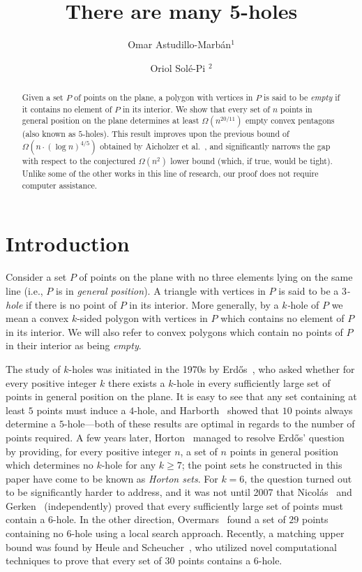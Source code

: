 \documentclass[12pt,reqno, a4paper]{amsart}
\title{There are many 5-holes}
\author{Omar Astudillo-Marbán$^1$ \and Oriol Solé-Pi $^2$}
\date{}
\begin{document}
\begin{abstract}
Given a set $P$ of points on the plane, a polygon with vertices in $P$ is said to be \emph{empty} if it contains no element of $P$ in its interior. We show that every set of $n$ points in general position on the plane determines at least $\Omega(n^{20/11})$ empty convex pentagons (also known as $5$-holes). This result improves upon the previous bound of $\Omega(n\cdot(\log n)^{4/5})$ obtained by Aicholzer et al.~\cite{aichholzer2020superlinear}, and significantly narrows the gap with respect to the conjectured $\Omega(n^2)$ lower bound (which, if true, would be tight). Unlike some of the other works in this line of research, our proof does not require computer assistance.
\end{abstract}
\small\maketitle


\section{Introduction}
Consider a set $P$ of points on the plane with no three elements lying on the same line (i.e., $P$ is in \textit{general position}). A triangle with vertices in $P$ is said to be a $3$\textit{-hole} if there is no point of $P$ in its interior. More generally, by a $k$\textit-hole of $P$ we mean a convex $k$-sided polygon with vertices in $P$ which contains no element of $P$ in its interior. We will also refer to convex polygons which contain no points of $P$ in their interior as being \textit{empty}.

The study of $k$-holes was initiated in the 1970s by Erd\H{o}s~\cite{erdos1978some}, who asked whether for every positive integer $k$ there exists a $k$-hole in every sufficiently large set of points in general position on the plane. It is easy to see that any set containing at least $5$ points must induce a $4$-hole, and Harborth~\cite{harborth1978konvexe} showed that $10$ points always determine a $5$-hole---both of these results are optimal in regards to the number of points required. A few years later, Horton~\cite{horton1983sets} managed to resolve Erd\H{o}s' question by providing, for every positive integer $n$, a set of $n$ points in general position which determines no $k$-hole for any $k\geq 7$; the point sets he constructed in this paper have come to be known as \textit{Horton sets}. For $k=6$, the question turned out to be significantly harder to address, and it was not until 2007 that Nicolás~\cite{nicolas2007empty} and Gerken~\cite{gerken2008empty} (independently) proved that every sufficiently large set of points must contain a $6$-hole. In the other direction, Overmars~\cite{overmars2002finding} found a set of $29$ points containing no $6$-hole using a local search approach. Recently, a matching upper bound was found by Heule and Scheucher~\cite{heule2024happy}, who utilized novel computational techniques to prove that every set of $30$ points contains a $6$-hole. 
\end{document}
